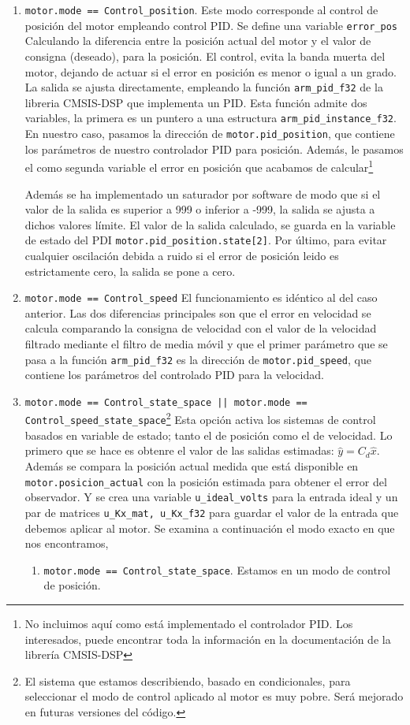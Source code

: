 \begin{enumerate}
    \item \texttt{motor.mode == Control\_position}. Este modo corresponde al control de posición del motor empleando control PID. Se define una variable \texttt{error\_pos} Calculando la diferencia entre la posición actual del motor y el valor de consigna (deseado), para la posición. El control, evita la banda muerta del motor, dejando de actuar si el error en posición es menor o igual a un grado. La salida se ajusta directamente, empleando la función \texttt{arm\_pid\_f32} de la libreria CMSIS-DSP que implementa un PID. Esta función admite dos variables, la primera es un puntero a una estructura \texttt{arm\_pid\_instance\_f32}. En nuestro caso, pasamos la dirección de \texttt{motor.pid\_position}, que contiene los parámetros de nuestro controlador PID para posición. Además, le pasamos el como segunda variable el error en posición que acabamos de calcular\footnote{No incluimos aquí como está implementado el controlador PID. Los interesados, puede encontrar toda la información en la documentación de la librería CMSIS-DSP}


    Además se ha implementado un saturador por software de modo que si el valor de la salida es superior a 999 o inferior a -999, la salida se ajusta a dichos valores límite. El valor de la salida calculado, se guarda en la variable de estado del PDI \texttt{motor.pid\_position.state[2]}. Por último, para evitar cualquier oscilación debida a ruido si el error de posición leido es estrictamente cero, la salida se pone a cero.
    \item  \texttt{motor.mode == Control\_speed} El funcionamiento es idéntico al del caso anterior. Las dos diferencias principales son que el error en velocidad se calcula comparando la consigna de velocidad con el valor de la velocidad filtrado mediante el filtro de media móvil y que el primer parámetro que se pasa a la función \texttt{arm\_pid\_f32} es la dirección de \texttt{motor.pid\_speed}, que contiene los parámetros del controlado PID para la velocidad.
    \item \texttt{motor.mode == Control\_state\_space || motor.mode == Control\_speed\_state\_space}\footnote{El sistema que estamos describiendo, basado en condicionales, para seleccionar el modo de control aplicado al motor es muy pobre. Será mejorado en futuras versiones del código.} Esta opción activa los sistemas de control basados en variable de estado; tanto el de posición como el de velocidad. Lo primero que se hace es obtenre el valor de las salidas estimadas: $\hat{y} = C_d\hat{x}$. Además se compara la posición actual medida que está disponible en \texttt{motor.posicion\_actual} con la posición estimada para obtener el error del observador. Y se crea una variable \texttt{u\_ideal\_volts} para la entrada ideal y un par de matrices \texttt{u\_Kx\_mat, u\_Kx\_f32} para guardar el valor de la entrada que debemos aplicar al motor. Se examina a continuación el modo exacto en que nos encontramos,
    \begin{enumerate}
        \item \texttt{motor.mode == Control\_state\_space}. Estamos en un modo de control de posición. 
        

\end{enumerate}
\end{enumerate}
